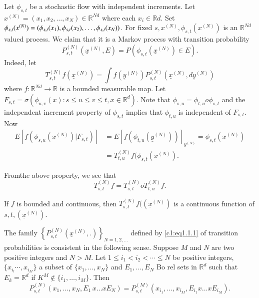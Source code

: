   Let $\phi_{s,t}$ be a stochastic flow with independent
  increments. Let $x^{(N)} = (x_1, x_2, \ldots,  x_N) \in
  \mathbb{R}^{Nd}$ where each $x_i \in \mathbb{R}d$. Set
  $\phi_{s,t}(x^{(N)}) = (\phi_{s,t}(x_1),\break \phi_{s,t}(x_2), \ldots,
  \phi_{s,t}(x_N))$. For fixed $s, x^{(N)}, \phi_{s,t}(x^{(N)})$ is an
  $\mathbb{R}^{Nd}$ valued process. We claim that it is a Markov
  process with transition probability 
  \begin{equation*}
    P^{(N)}_{s,t} (\underline{x}^{(N)}, E) = P
    (\phi_{s,t}(\underline{x}^{(N)}) \in E). \tag{1.1.1}\label{c1:eq1.1.1} 
  \end{equation*}  
  Indeed, let
  \begin{equation*}
    T^{(N)}_{s,t} f (\underline{x}^{(N)}) = \int f(
    \underline{y}^{(N)}) P^{(N)}_{s,t} (\underline{x}^{(N)},
    d\underline{y}^{(N)}) \tag{1.1.2}\label{c1:eq1.1.2} 
  \end{equation*}  
  where $f: \mathbb{R}^{Nd} \rightarrow \mathbb{R}$ is a bounded
  measurable map. Let $F_{s,t} = \sigma (\phi_{u,v}(x):  s \le u \le v
  \le t, x \in \mathbb{R}^d)$. Note that $\phi_{s,u}
  = \phi_{t,u} o \phi_{s,t} $ and the independent increment property of
  $\phi_{s,t}$ implies that $\phi_{t,u}$ is independent of
  $F_{s,t}$. Now  
  \begin{align*}
    E\left[f\left(\phi_{s,u}(\underline{x}^{(N)}) |F_{s,t}\right)\right] & =
    E\left[f\left(\phi_{t,u}(\underline{y}^{(N)})\right)\right]_{y^{(N)}}
    = \phi_{s,t}(\underline{x}^{(N)}) \\ 
    & = T^{(N)}_{t,u} f(\phi_{s,t}(\underline{x}^{(N)}).
  \end{align*}  
  
  From\pageoriginale the above property, we see that 
  \begin{equation*}
    T^{(N)}_{s,t} f = T^{(N)}_{s,t} 
    o T^{(N)}_{t,u} f. \tag{1.1.3}\label{c1:eq1.1.3}
  \end{equation*}  
  
  
  If $f$ is bounded and continuous, then $T^{(N)}_{s,t}
  f((\underline{x}^{(N)})$ is a continuous function of $s,t,
  (\underline{x}^{(N)}) $. 

 \setcounter{remark}{1}
 \begin{remark}\label{c1:rem1.1.2} %
   The family $\left\{ P^{(N)}_{s,t} (\underline{x}^{(N)},. )\right\}_{N=1,2,
     \ldots}$ defined by \eqref{c1:eq1.1.1} of transition probabilities is
   consistent in the following sense. Suppose $M$ and $N$ are two
   positive integers and $N > M$. Let $1 \le i_1 < i_2 < \cdots \le N$
   be positive integers, $\{x_{i_l} \cdots,  x_{i_M} \}$ a subset of
   $\{x_1, \ldots,  x_N \}$ and $E_1, \ldots,  E_N$ Bo rel sets in
   $\mathbb{R}^d$ such that $E_k = \mathbb{R}^d$ if $K^M \notin \{i_1,
   \ldots,  i_M \}$. Then  
   \begin{equation*}
     P^{(N)}_{s,t} (x_1, \ldots,  x_N, E_1  \, x \ldots x E_N) =
     P^{(M)}_{s,t} (x_{i_1}, \ldots,  x_{i_M}, E_{i_1} x \ldots
     x E_{i_M}). \tag{1.1.4}\label{c1:eq1.1.4} 
   \end{equation*}
 \end{remark} 

